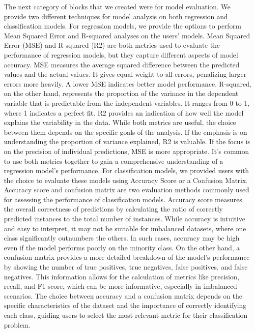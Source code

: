 \documentclass{article}
\theoremstyle{theorem}
\theoremstyle{definition}
\theoremstyle{remark}
\begin{document}
The next category of blocks that we created were for model evaluation. We provide two different techniques for model analysis on both regression and classification models. For regression models, we provide the options to perform Mean Squared Error and R-squared analyses on the users' models. Mean Squared Error (MSE) and R-squared (R2) are both metrics used to evaluate the performance of regression models, but they capture different aspects of model accuracy. MSE measures the average squared difference between the predicted values and the actual values. It gives equal weight to all errors, penalizing larger errors more heavily. A lower MSE indicates better model performance. R-squared, on the other hand, represents the proportion of the variance in the dependent variable that is predictable from the independent variables. It ranges from 0 to 1, where 1 indicates a perfect fit. R2 provides an indication of how well the model explains the variability in the data. While both metrics are useful, the choice between them depends on the specific goals of the analysis. If the emphasis is on understanding the proportion of variance explained, R2 is valuable. If the focus is on the precision of individual predictions, MSE is more appropriate. It's common to use both metrics together to gain a comprehensive understanding of a regression model's performance. For classification models, we provided users with the choice to evaluate these models using Accuracy Score or a Confusion Matrix. Accuracy score and confusion matrix are two evaluation methods commonly used for assessing the performance of classification models. Accuracy score measures the overall correctness of predictions by calculating the ratio of correctly predicted instances to the total number of instances. While accuracy is intuitive and easy to interpret, it may not be suitable for imbalanced datasets, where one class significantly outnumbers the others. In such cases, accuracy may be high even if the model performs poorly on the minority class. On the other hand, a confusion matrix provides a more detailed breakdown of the model's performance by showing the number of true positives, true negatives, false positives, and false negatives. This information allows for the calculation of metrics like precision, recall, and F1 score, which can be more informative, especially in imbalanced scenarios. The choice between accuracy and a confusion matrix depends on the specific characteristics of the dataset and the importance of correctly identifying each class, guiding users to select the most relevant metric for their classification problem.
\end{document}
